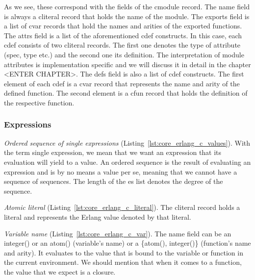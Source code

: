 As we see, these correspond with the fields of the c\textunderscore module record. The name
field is always a c\textunderscore literal record that holds the name of the module. The
exports field is a list of c\textunderscore var records that hold the names and arities of the
exported functions. The attrs field is a list of the aforementioned c\textunderscore def
constructs. In this case, each c\textunderscore def consists of two c\textunderscore literal records. The
first one denotes the type of attribute (spec, type etc.) and the second one
its definition. The interpretation of module attributes is implementation
specific and we will discuss it in detail in the chapter <ENTER CHAPTER>. The
defs field is also a list of c\textunderscore def constructs. The first element of each c\textunderscore def
is a c\textunderscore var record that represents the name and arity of the defined function.
The second element is a c\textunderscore fun record that holds the definition of the
respective function.

\subsubsection{Expressions}


\emph{Ordered sequence of single expressions} (Listing~\ref{lst:core_erlang_c_values}).
With the term single expression, we mean that we want an expression that its
evaluation will yield to a value. An ordered sequence is the result of
evaluating an expression and is by no means a value per se, meaning that we
cannot have a sequence of sequences. The length of the es list denotes the
degree of the sequence.


\emph{Atomic literal} (Listing~\ref{lst:core_erlang_c_literal}).
The c\textunderscore literal record holds a  literal and represents the Erlang value denoted
by that literal.



\emph{Variable name} (Listing~\ref{lst:core_erlang_c_var}).
The name field can be an integer() or an atom() (variable’s name) or a \{atom(),
integer()\} (function’s name and arity). It evaluates to the value that is bound
to the variable or function in the current environment. We should mention that
when it comes to a function, the value that we expect is a closure.
